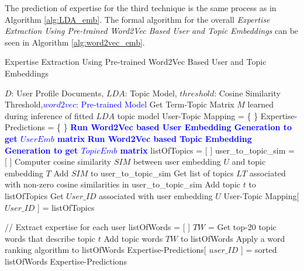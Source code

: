             The prediction of expertise for the third technique is the same process as in Algorithm \ref{alg:LDA_emb}. The formal algorithm for the overall \emph{Expertise Extraction Using Pre-trained Word2Vec Based User and Topic Embeddings} can be seen in Algorithm \ref{alg:word2vec_emb}.
        
            \begin{algorithm}
            \caption{Expertise Extraction Using Pre-trained Word2Vec Based User and Topic Embeddings}
            \label{alg:word2vec_emb}
            \begin{algorithmic}[1]
               \REQUIRE $D$: User Profile Documents, $LDA$: Topic Model, $threshold$: Cosine Similarity Threshold,\textcolor{blue}{$word2vec$: Pre-trained Model}
                \STATE Get Term-Topic Matrix $M$ learned during inference of fitted $LDA$ topic model
                \STATE User-Topic Mapping = \{ \}
                \STATE Expertise-Predictions = \{ \}
                \STATE \textbf{\textcolor{blue}{Run Word2Vec based User Embedding Generation to get $UserEmb$ matrix}}
                \STATE \textbf{\textcolor{blue}{Run Word2Vec based Topic Embedding Generation to get $TopicEmb$ matrix}}
                \STATE
                    \STATE listOfTopics = [ ]
                    \STATE user\_to\_topic\_sim = [ ]
                        \STATE Computer cosine similarity $SIM$ between user embedding $U$ and topic embedding $T$
                        \STATE Add $SIM$ to user\_to\_topic\_sim
                    \ENDFOR
                    \STATE
                    \STATE Get list of topics $LT$ associated with non-zero cosine similarities in user\_to\_topic\_sim
                            \STATE Add topic $t$ to listOfTopics
                        \ENDIF
                    \ENDFOR
                    \STATE Get $User\_ID$ associated with user embedding $U$
                    \STATE User-Topic Mapping[ $User\_ID$ ] = listOfTopics
                    
                    \STATE
                    \STATE // Extract expertise for each user
                    \STATE listOfWords = [ ]
                        \STATE $TW$ = Get top-20 topic words that describe topic $t$
                        \STATE Add topic words $TW$ to listOfWords
                    \ENDFOR
                    \STATE Apply a word ranking algorithm to listOfWords
                    \STATE Expertise-Predictions[ $user\_ID$ ] = sorted listOfWords
                \ENDFOR
                \RETURN Expertise-Predictions
            \end{algorithmic}
            \end{algorithm}
            
